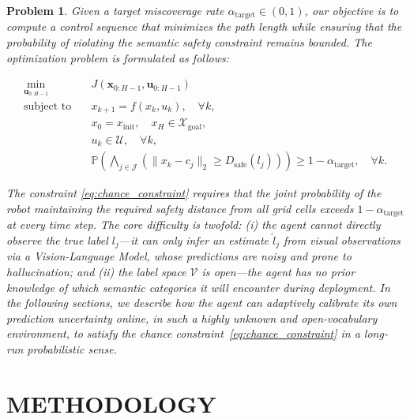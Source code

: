 \documentclass[letterpaper, 10 pt, conference]{ieeeconf}  %
\newtheorem{myprob}{\bf Problem}
\begin{document}
\begin{myprob}
Given a target miscoverage rate $\alpha_{\text{target}} \in (0, 1)$, our objective is to compute a control sequence that minimizes the path length while ensuring that the probability of violating the semantic safety constraint remains bounded. The optimization problem is formulated as follows:

\begin{subequations}
\label{eq:optimization_problem}
\begin{align}
        \min_{\mathbf{u}_{0:H-1}} \quad & J(\mathbf{x}_{0:H-1},\mathbf{u}_{0:H-1}) \\
    \text{subject to} \quad & x_{k+1} = f(x_k, u_k), \quad \forall k, \\
    & x_0 = x_{\text{init}}, \quad x_H \in \mathcal{X}_{\text{goal}}, \\
    & u_k \in \mathcal{U}, \quad \forall k, \\
    & \mathbb{P}\left( \bigwedge_{j \in \mathcal{J}} \left( \| x_k - c_j \|_2 \ge D_{\text{safe}}(l_j) \right) \right) \ge 1 - \alpha_{\text{target}}, \quad \forall k. \label{eq:chance_constraint}
\end{align}
\end{subequations}

The constraint \eqref{eq:chance_constraint} requires that the joint probability of the robot maintaining the required safety distance from \textit{all} grid cells exceeds $1 - \alpha_{\text{target}}$ at every time step. The core difficulty is twofold: (i) the agent cannot directly observe the true label $l_j$---it can only infer an estimate $\hat{l}_j$ from visual observations via a Vision-Language Model, whose predictions are noisy and prone to hallucination; and (ii) the label space $\mathcal{V}$ is \textit{open}---the agent has no prior knowledge of which semantic categories it will encounter during deployment. In the following sections, we describe how the agent can adaptively calibrate its own prediction uncertainty online, in such a highly unknown and open-vocabulary environment, to satisfy the chance constraint~\eqref{eq:chance_constraint} in a long-run probabilistic sense.

\section{METHODOLOGY}
\label{sec:methodology}


\end{myprob}
\end{document}
